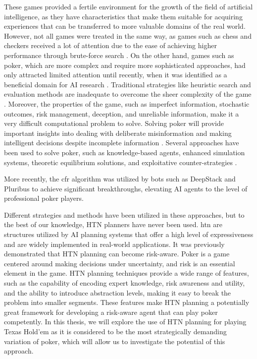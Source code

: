 These games provided a fertile environment for the growth of the field of artificial intelligence, as they have characteristics that make them suitable for acquiring experiences that can be transferred to more valuable domains of the real world. However, not all games were treated in the same way, as games such as chess and checkers received a lot of attention due to the ease of achieving higher performance through brute-force search \cite{billings1998poker}. On the other hand, games such as poker, which are more complex and require more sophisticated approaches, had only attracted limited attention \cite{billings2006algorithms} until recently, when it was identified as a beneficial domain for AI research \cite{billings1998poker}. Traditional strategies like heuristic search and evaluation methods are inadequate to overcome the sheer complexity of the game \cite{billings_challenge_2002}. Moreover, the properties of the game, such as imperfect information, stochastic outcomes, risk management, deception, and unreliable information, make it a very difficult computational problem to solve. Solving poker will provide important insights into dealing with deliberate misinformation and making intelligent decisions despite incomplete information \cite{billings2006algorithms}. Several approaches have been used to solve poker, such as knowledge-based agents, enhanced simulation systems, theoretic equilibrium solutions, and exploitative counter-strategies \cite{rubin2011computer}.

More recently, the \gls{cfr} algorithm was utilized by bots such as DeepStack \cite{moravvcik2017deepstack} and Pluribus \cite{brown2019superhuman} to achieve significant breakthroughs, elevating AI agents to the level of professional poker players.

Different strategies and methods have been utilized in these approaches, but to the best of our knowledge, HTN planners have never been used. \gls{htn} are structures utilized by AI planning systems that offer a high level of expressiveness \cite{erol1994htn} and are widely implemented in real-world applications. It was previously \cite{alnazer2022risk} demonstrated that HTN planning can become risk-aware. Poker is a game centered around making decisions under uncertainty, and risk is an essential element in the game. HTN planning techniques provide a wide range of features, such as the capability of encoding expert knowledge, risk awareness and utility, and the ability to introduce abstraction levels, making it easy to break the problem into smaller segments. These features make HTN planning a potentially great framework for developing a risk-aware agent that can play poker competently. In this thesis, we will explore the use of HTN planning for playing Texas Hold'em as it is considered to be the most strategically demanding variation of poker, which will allow us to investigate the potential of this approach.


